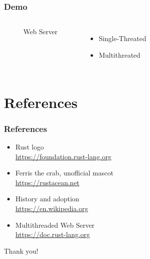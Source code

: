 \documentclass{beamer}
\begin{document}
\begin{frame}
\frametitle{Demo}

\begin{columns}[c] %

  \begin{figure}
    \centering
  \caption{Web Server}
  \end{figure}

\begin{itemize}
\item Single-Threated
\item Multithreated
\end{itemize}

\end{columns}

\end{frame}

\section{References}

\begin{frame}
\frametitle{References}
\begin{itemize}
\item Rust logo\\
\href{https://foundation.rust-lang.org/policies/logo-policy-and-media-guide/\#the-rust-trademarks}{https://foundation.rust-lang.org}
\item Ferris the crab, unofficial mascot\\
\href{https://rustacean.net}{https://rustacean.net}
\item History and adoption\\
\href{https://en.wikipedia.org/wiki/Rust_(programming_language)}{https://en.wikipedia.org}
\item Multithreaded Web Server\\
\href{https://doc.rust-lang.org/stable/book/ch20-00-final-project-a-web-server.html}{https://doc.rust-lang.org}
\end{itemize}
\end{frame}

\begin{frame}
\Huge{\centerline{Thank you!}}
\end{frame}
\end{document}
